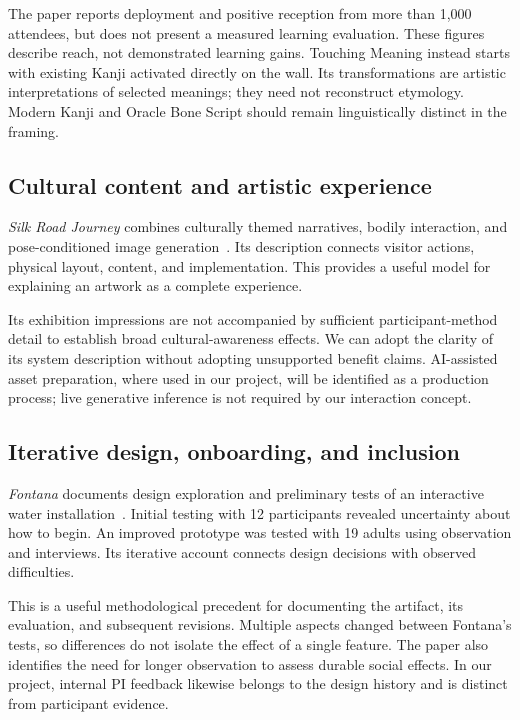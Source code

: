 \documentclass[11pt,letterpaper]{article}
\begin{document}
The paper reports deployment and positive reception from more than 1,000 attendees, but does not present a measured learning evaluation. These figures describe reach, not demonstrated learning gains. Touching Meaning instead starts with existing Kanji activated directly on the wall. Its transformations are artistic interpretations of selected meanings; they need not reconstruct etymology. Modern Kanji and Oracle Bone Script should remain linguistically distinct in the framing.

\subsection{Cultural content and artistic experience}
\emph{Silk Road Journey} combines culturally themed narratives, bodily interaction, and pose-conditioned image generation~\cite{li2024}. Its description connects visitor actions, physical layout, content, and implementation. This provides a useful model for explaining an artwork as a complete experience.

Its exhibition impressions are not accompanied by sufficient participant-method detail to establish broad cultural-awareness effects. We can adopt the clarity of its system description without adopting unsupported benefit claims. AI-assisted asset preparation, where used in our project, will be identified as a production process; live generative inference is not required by our interaction concept.

\subsection{Iterative design, onboarding, and inclusion}
\emph{Fontana} documents design exploration and preliminary tests of an interactive water installation~\cite{vanrenswouw2022}. Initial testing with 12 participants revealed uncertainty about how to begin. An improved prototype was tested with 19 adults using observation and interviews. Its iterative account connects design decisions with observed difficulties.

This is a useful methodological precedent for documenting the artifact, its evaluation, and subsequent revisions. Multiple aspects changed between Fontana's tests, so differences do not isolate the effect of a single feature. The paper also identifies the need for longer observation to assess durable social effects. In our project, internal PI feedback likewise belongs to the design history and is distinct from participant evidence.
\end{document}

